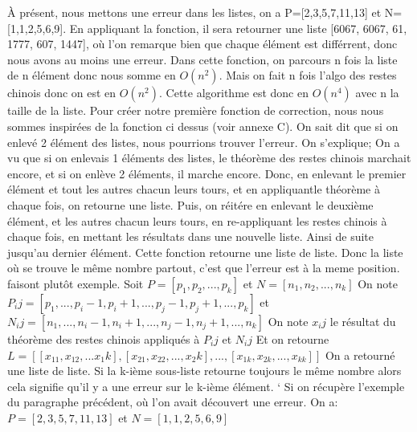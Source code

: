 \documentclass[a4paper, 11pt]{report}
\begin{document}
À présent, nous mettons une erreur dans les listes, on a P=[2,3,5,7,11,13] et N=[1,1,2,5,6,9]. En appliquant la fonction, il sera retourner une liste [6067, 6067, 61, 1777, 607, 1447], où l'on remarque bien que chaque élément est différrent, donc nous avons au moins une erreur.
Dans cette fonction, on parcours n fois la liste de n élément donc nous somme en $O(n^2)$. Mais on fait n fois l'algo des restes chinois donc on est en $O(n^2)$. Cette algorithme est donc en $O(n^4)$ avec n la taille de la liste. 
\newline 
\newline
Pour créer notre première fonction de correction, nous nous sommes inspirées de la fonction ci dessus (voir annexe C). On sait dit que si on enlevé 2 élément des listes, nous pourrions trouver l'erreur. On s'explique;
On a vu que si on enlevais 1 éléments des listes, le théorème des restes chinois marchait encore, et si on enlève 2 éléments, il marche encore. Donc, en enlevant le premier élément et tout les autres chacun leurs
tours, et en appliquantle théorème à chaque fois, on retourne une liste. Puis, on réitére en enlevant le deuxième élément, et les autres chacun leurs tours, en re-appliquant les restes chinois à chaque fois, en mettant les résultats dans
une nouvelle liste. Ainsi de suite jusqu'au dernier élément. Cette fonction retourne une liste de liste. Donc la liste où se trouve le même nombre partout, c'est que l'erreur est à la meme position.
faisont plutôt exemple.
\newline 
Soit $P=[p_1, p_2, ... , p_k]$ et $N=[n_1 , n_2, ... ,n_k]$ \newline
On note $P_ij =[p_1 , ... , p_i-1 , p_i+1 , ... , p_j-1 , p_j+1 , ... , p_k]$ et $N_ij=[n_1, ..., n_i-1, n_i+1, ..., n_j-1, n_j+1, ..., n_k]$ \newline
On note $x_ij$ le résultat du théorème des restes chinois appliqués à $P_ij$ et $N_ij$ \newline
Et on retourne $L=[[x_11,x_12,...x_1k],[x_21,x_22,...,x_2k],...,[x_{1k},x_{2k},...,x_{kk}]]$ \newline
On a retourné une liste de liste. Si la k-ième sous-liste retourne toujours le même nombre alors cela signifie qu'il y a une erreur sur le k-ième élément. \newline`
\newline
Si on récupère l'exemple du paragraphe précédent, où l'on avait découvert une erreur. \newline
On a: $P=[2,3,5,7,11,13]$ et $N=[1,1,2,5,6,9]$ \newline
\end{document}
